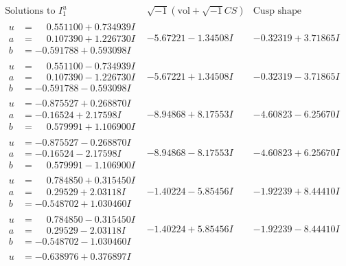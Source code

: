 \documentclass[1p]{elsarticle_modified}
\theoremstyle{definition}
\newcommand{\I}{\sqrt{-1}}
\begin{document}
$$\begin{array}{c|c|c}  
\text{Solutions to }I^u_{1}& \I (\text{vol} + \sqrt{-1}CS) & \text{Cusp shape}\\
 \hline 
\begin{aligned}
u &= \phantom{-}0.551100 + 0.734939 I \\
a &= \phantom{-}0.107390 + 1.226730 I \\
b &= -0.591788 + 0.593098 I\end{aligned}
 & -5.67221 - 1.34508 I & -0.32319 + 3.71865 I \\ \hline\begin{aligned}
u &= \phantom{-}0.551100 - 0.734939 I \\
a &= \phantom{-}0.107390 - 1.226730 I \\
b &= -0.591788 - 0.593098 I\end{aligned}
 & -5.67221 + 1.34508 I & -0.32319 - 3.71865 I \\ \hline\begin{aligned}
u &= -0.875527 + 0.268870 I \\
a &= -0.16524 + 2.17598 I \\
b &= \phantom{-}0.579991 + 1.106900 I\end{aligned}
 & -8.94868 + 8.17553 I & -4.60823 - 6.25670 I \\ \hline\begin{aligned}
u &= -0.875527 - 0.268870 I \\
a &= -0.16524 - 2.17598 I \\
b &= \phantom{-}0.579991 - 1.106900 I\end{aligned}
 & -8.94868 - 8.17553 I & -4.60823 + 6.25670 I \\ \hline\begin{aligned}
u &= \phantom{-}0.784850 + 0.315450 I \\
a &= \phantom{-}0.29529 + 2.03118 I \\
b &= -0.548702 + 1.030460 I\end{aligned}
 & -1.40224 - 5.85456 I & -1.92239 + 8.44410 I \\ \hline\begin{aligned}
u &= \phantom{-}0.784850 - 0.315450 I \\
a &= \phantom{-}0.29529 - 2.03118 I \\
b &= -0.548702 - 1.030460 I\end{aligned}
 & -1.40224 + 5.85456 I & -1.92239 - 8.44410 I \\ \hline\begin{aligned}
u &= -0.638976 + 0.376897 I \\

\end{aligned}
\end{array}$$
\end{document}
